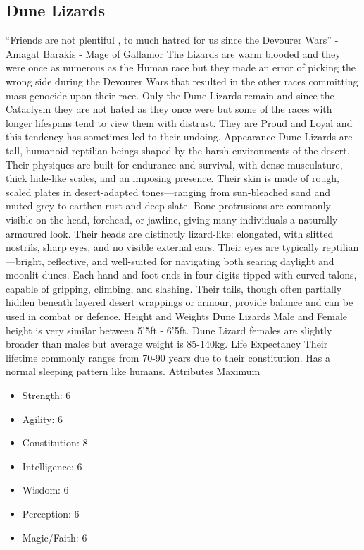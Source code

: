 \documentclass[12pt]{article}
\begin{document}
\begin{multicols}{2}
\subsection{Dune Lizards}
“Friends are not plentiful , to much hatred for us since the Devourer Wars” - Amagat Barakis - Mage of Gallamor
The Lizards are warm blooded and they were once as numerous as the Human race but they made an error of picking the wrong side during the Devourer Wars that resulted in the other races committing mass genocide upon their race. Only the Dune Lizards remain and since the Cataclysm they are not hated as they once were but some of the races with longer lifespans tend to view them with distrust. They are Proud and Loyal and this tendency has sometimes led to their undoing.
Appearance 
Dune Lizards are tall, humanoid reptilian beings shaped by the harsh environments of the desert. Their physiques are built for endurance and survival, with dense musculature, thick hide-like scales, and an imposing presence.
Their skin is made of rough, scaled plates in desert-adapted tones—ranging from sun-bleached sand and muted grey to earthen rust and deep slate. Bone protrusions are commonly visible on the head, forehead, or jawline, giving many individuals a naturally armoured look. Their heads are distinctly lizard-like: elongated, with slitted nostrils, sharp eyes, and no visible external ears. Their eyes are typically reptilian—bright, reflective, and well-suited for navigating both searing daylight and moonlit dunes.
Each hand and foot ends in four digits tipped with curved talons, capable of gripping, climbing, and slashing. Their tails, though often partially hidden beneath layered desert wrappings or armour, provide balance and can be used in combat or defence.
Height and Weights
Dune Lizards Male and Female height is very similar between 5'5ft - 6'5ft. Dune Lizard females are slightly broader than males but average weight is 85-140kg.
Life Expectancy
Their lifetime commonly ranges from 70-90 years due to their constitution. Has a normal sleeping pattern like humans.
Attributes Maximum
\begin{itemize}
\item Strength: 6
\item Agility: 6
\item Constitution: 8
\item Intelligence: 6
\item Wisdom: 6
\item Perception: 6
\item Magic/Faith: 6

\end{itemize}
\end{multicols}
\end{document}

